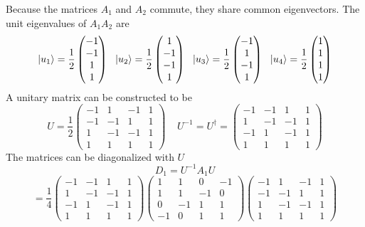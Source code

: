 \begin{sol}
Because the matrices $A_1$ and $A_2$ commute, they share common eigenvectors. The unit eigenvalues of $A_1A_2$ are
\begin{equation}
	\ket{u_1}=\frac{1}{2}\begin{pmatrix}-1\\-1\\1\\1\end{pmatrix}\:\:\:\ket{u_2}=\frac{1}{2}\begin{pmatrix}1\\-1\\-1\\1\end{pmatrix}\:\:\:\ket{u_3}=\frac{1}{2}\begin{pmatrix}-1\\1\\-1\\1\end{pmatrix}\:\:\:\ket{u_4}=\frac{1}{2}\begin{pmatrix}1\\1\\1\\1\end{pmatrix}
\end{equation}
A unitary matrix can be constructed to be
\begin{equation}
	U=\frac{1}{2}\begin{pmatrix}-1&1&-1&1\\-1&-1&1&1\\1&-1&-1&1\\1&1&1&1\end{pmatrix}\:\:\:\:\:U^{-1}=U^\dagger=\begin{pmatrix}-1&-1&1&1\\1&-1&-1&1\\-1&1&-1&1\\1&1&1&1\end{pmatrix}
\end{equation}
The matrices can be diagonalized with $U$
\begin{equation}
	D_1=U^{-1}A_1U
\end{equation}\begin{equation}
	=\frac{1}{4}\begin{pmatrix}-1&-1&1&1\\1&-1&-1&1\\-1&1&-1&1\\1&1&1&1\end{pmatrix} \begin{pmatrix}1&1&0&-1\\1&1&-1&0\\0&-1&1&1\\-1&0&1&1\end{pmatrix}\begin{pmatrix}-1&1&-1&1\\-1&-1&1&1\\1&-1&-1&1\\1&1&1&1\end{pmatrix}

\end{equation}
\end{sol}
